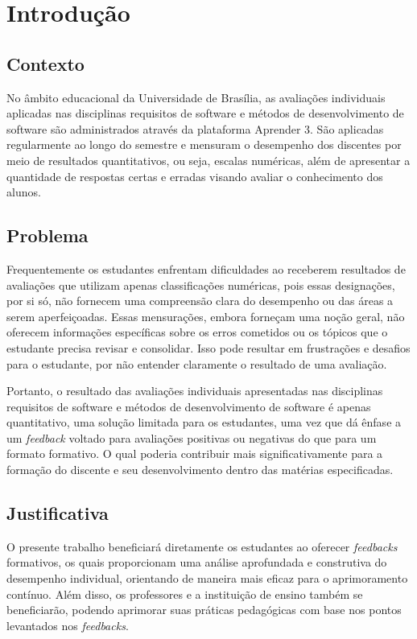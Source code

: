 \chapter[Introdução]{Introdução}

\section{Contexto}

No âmbito educacional da Universidade de Brasília, as avaliações individuais aplicadas nas disciplinas requisitos de software e métodos de desenvolvimento de software são administrados através da plataforma Aprender 3. São aplicadas regularmente ao longo do semestre e mensuram o desempenho dos discentes por meio de resultados quantitativos, ou seja, escalas numéricas, além de apresentar a quantidade de respostas certas e erradas visando avaliar o conhecimento dos alunos. 

\section{Problema}

Frequentemente os estudantes enfrentam dificuldades ao receberem resultados de avaliações que utilizam apenas classificações numéricas, pois essas designações, por si só, não fornecem uma compreensão clara do desempenho ou das áreas a serem aperfeiçoadas. Essas mensurações, embora forneçam uma noção geral, não oferecem informações específicas sobre os erros cometidos ou os tópicos que o estudante precisa revisar e consolidar. Isso pode resultar em frustrações e desafios para o estudante, por não entender claramente o resultado de uma avaliação. 

Portanto, o resultado das avaliações individuais apresentadas nas disciplinas requisitos de software e métodos de desenvolvimento de software é apenas quantitativo, uma solução limitada para os estudantes, uma vez que dá ênfase a um \textit{feedback} voltado para avaliações positivas ou negativas do que para um formato formativo. O qual poderia contribuir mais significativamente para a formação do discente e seu desenvolvimento dentro das matérias especificadas.

\section{Justificativa}

O presente trabalho beneficiará diretamente os estudantes ao oferecer \textit{feedbacks} formativos, os quais proporcionam uma análise aprofundada e construtiva do desempenho individual, orientando de maneira mais eficaz para o aprimoramento contínuo. Além disso, os professores e a instituição de ensino também se beneficiarão, podendo aprimorar suas práticas pedagógicas com base nos pontos levantados nos \textit{feedbacks}.

